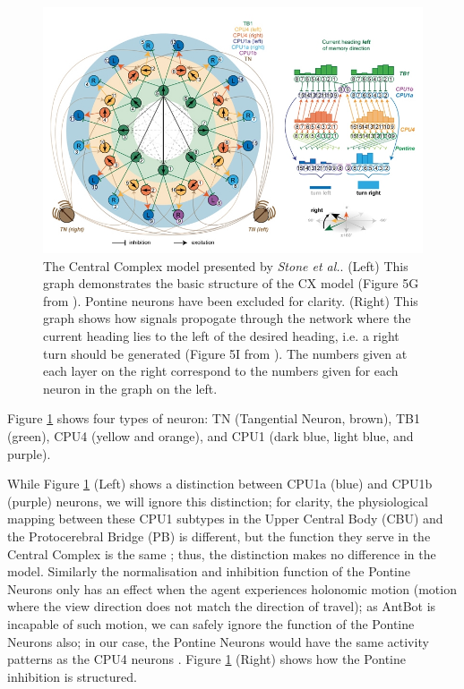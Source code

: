 \documentclass[a4paper,11pt,twoside,openright]{article}
\begin{document}
\begin{figure}[h!]
  \centering
  \includegraphics[width=\textwidth]{StoneCXModel}
  \caption{\label{fig:cx} The Central Complex model presented by
    \textit{Stone et al.}. (Left) This graph demonstrates the basic structure of
    the CX model (Figure 5G from \cite{Stone2017}). Pontine neurons have been
    excluded for clarity.
    (Right) This graph shows how signals propogate through the network where the
    current heading lies to the left of the desired heading, i.e. a right turn
    should be generated (Figure 5I from \cite{Stone2017}). The numbers given at
    each layer on the right correspond to the numbers given for each neuron
    in the graph on the left.
  }
\end{figure}

Figure \ref{fig:cx} shows four types of neuron: TN (Tangential Neuron,
brown), TB1 (green), CPU4 (yellow and orange), and CPU1 (dark blue,
light blue, and purple).
\newline
\par

While Figure \ref{fig:cx} (Left) shows a distinction between CPU1a (blue) and
CPU1b (purple) neurons, we will ignore this distinction; for clarity, the
physiological mapping between these CPU1 subtypes in the Upper Central Body (CBU)
and the Protocerebral Bridge (PB) is different, but the function they serve in
the Central Complex is the same \cite{Stone2017}; thus, the distinction makes
no difference in the model. Similarly the normalisation and inhibition function
of the Pontine Neurons only has an effect when the agent experiences holonomic
motion (motion where the view direction does not match the direction of travel);
as AntBot is incapable of such motion, we can safely ignore the function of
the Pontine Neurons also; in our case, the Pontine Neurons would have the
same activity patterns as the CPU4 neurons \cite{Stone2017}. Figure \ref{fig:cx}
(Right) shows how the Pontine inhibition is structured.
\newline
\par
\end{document}
